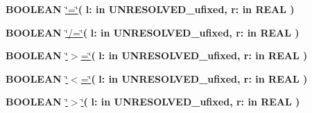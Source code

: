 \begin{DoxyCompactItemize}
\item 
{\bfseries {\bfseries \textcolor{comment}{B\+O\+O\+L\+E\+A\+N}\textcolor{vhdlchar}{ }}} \hyperlink{class__fixed__pkg_a7949e9258ea0749e3b35961feea8db87}{\char`\"{}=\char`\"{}}{\bfseries  ( }{\bfseries \textcolor{vhdlchar}{l\+: }\textcolor{stringliteral}{in }\textcolor{vhdlchar}{U\+N\+R\+E\+S\+O\+L\+V\+E\+D\+\_\+ufixed}}{\bfseries  , \textcolor{vhdlchar}{r\+: }\textcolor{stringliteral}{in }{\bfseries \textcolor{comment}{R\+E\+A\+L}\textcolor{vhdlchar}{ }}}{\bfseries  )} 
\item 
{\bfseries {\bfseries \textcolor{comment}{B\+O\+O\+L\+E\+A\+N}\textcolor{vhdlchar}{ }}} \hyperlink{class__fixed__pkg_a00087aded97b434060226b9ba63a9077}{\char`\"{}/=\char`\"{}}{\bfseries  ( }{\bfseries \textcolor{vhdlchar}{l\+: }\textcolor{stringliteral}{in }\textcolor{vhdlchar}{U\+N\+R\+E\+S\+O\+L\+V\+E\+D\+\_\+ufixed}}{\bfseries  , \textcolor{vhdlchar}{r\+: }\textcolor{stringliteral}{in }{\bfseries \textcolor{comment}{R\+E\+A\+L}\textcolor{vhdlchar}{ }}}{\bfseries  )} 
\item 
{\bfseries {\bfseries \textcolor{comment}{B\+O\+O\+L\+E\+A\+N}\textcolor{vhdlchar}{ }}} \hyperlink{class__fixed__pkg_a4cd07e388cdbb3996dd11f56781d3758}{\char`\"{}$>$=\char`\"{}}{\bfseries  ( }{\bfseries \textcolor{vhdlchar}{l\+: }\textcolor{stringliteral}{in }\textcolor{vhdlchar}{U\+N\+R\+E\+S\+O\+L\+V\+E\+D\+\_\+ufixed}}{\bfseries  , \textcolor{vhdlchar}{r\+: }\textcolor{stringliteral}{in }{\bfseries \textcolor{comment}{R\+E\+A\+L}\textcolor{vhdlchar}{ }}}{\bfseries  )} 
\item 
{\bfseries {\bfseries \textcolor{comment}{B\+O\+O\+L\+E\+A\+N}\textcolor{vhdlchar}{ }}} \hyperlink{class__fixed__pkg_a65b73a94d4fe541a941f431175b342b7}{\char`\"{}$<$=\char`\"{}}{\bfseries  ( }{\bfseries \textcolor{vhdlchar}{l\+: }\textcolor{stringliteral}{in }\textcolor{vhdlchar}{U\+N\+R\+E\+S\+O\+L\+V\+E\+D\+\_\+ufixed}}{\bfseries  , \textcolor{vhdlchar}{r\+: }\textcolor{stringliteral}{in }{\bfseries \textcolor{comment}{R\+E\+A\+L}\textcolor{vhdlchar}{ }}}{\bfseries  )} 
\item 
{\bfseries {\bfseries \textcolor{comment}{B\+O\+O\+L\+E\+A\+N}\textcolor{vhdlchar}{ }}} \hyperlink{class__fixed__pkg_ac6c82329bf849852be997a3d0a737cf9}{\char`\"{}$>$\char`\"{}}{\bfseries  ( }{\bfseries \textcolor{vhdlchar}{l\+: }\textcolor{stringliteral}{in }\textcolor{vhdlchar}{U\+N\+R\+E\+S\+O\+L\+V\+E\+D\+\_\+ufixed}}{\bfseries  , \textcolor{vhdlchar}{r\+: }\textcolor{stringliteral}{in }{\bfseries \textcolor{comment}{R\+E\+A\+L}\textcolor{vhdlchar}{ }}}{\bfseries  )} 

\end{DoxyCompactItemize}

